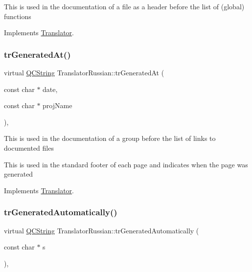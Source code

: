This is used in the documentation of a file as a header before the list of (global) functions 

Implements \mbox{\hyperlink{class_translator}{Translator}}.

\mbox{\label{class_translator_russian_a1b55e7f2d3af42b56b4e09d890d2ce57}} 
\subsubsection{\texorpdfstring{trGeneratedAt()}{trGeneratedAt()}}
{\footnotesize\ttfamily virtual \mbox{\hyperlink{class_q_c_string}{Q\+C\+String}} Translator\+Russian\+::tr\+Generated\+At (\begin{DoxyParamCaption}\item[{const char $\ast$}]{date,  }\item[{const char $\ast$}]{proj\+Name }\end{DoxyParamCaption})\hspace{0.3cm}{\ttfamily [inline]}, {\ttfamily [virtual]}}

This is used in the documentation of a group before the list of links to documented files

This is used in the standard footer of each page and indicates when the page was generated 

Implements \mbox{\hyperlink{class_translator}{Translator}}.

\mbox{\label{class_translator_russian_a6b2c6ad25b48acf8d7f398037ebd3d02}} 
\subsubsection{\texorpdfstring{trGeneratedAutomatically()}{trGeneratedAutomatically()}}
{\footnotesize\ttfamily virtual \mbox{\hyperlink{class_q_c_string}{Q\+C\+String}} Translator\+Russian\+::tr\+Generated\+Automatically (\begin{DoxyParamCaption}\item[{const char $\ast$}]{s }\end{DoxyParamCaption})\hspace{0.3cm}{\ttfamily [inline]}, {\ttfamily [virtual]}}

